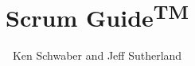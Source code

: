 \newcommand*{\BOOKCLASS}{}


\title{Scrum Guide\textsuperscript{TM}}
\author{Ken Schwaber and Jeff Sutherland}
\maketitle
\tableofcontents



